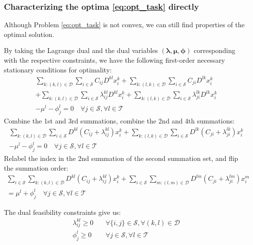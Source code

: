 \subsubsection{Characterizing the optima \eqref{eq:opt_task} directly}
Although Problem \eqref{eq:opt_task} is not convex, we can still find properties of the optimal solution.

By taking the Lagrange dual and the dual variables $(\boldsymbol{\lambda},\boldsymbol{\mu},\boldsymbol{\phi})$ corresponding with the respective constraints, we have the following first-order necessary stationary conditions for optimality:
\begin{align}
	\sum_{k:(k,l)\in\mathcal{D}}\sum_{i\in\mathcal{S}}C_{ij}D^{kl}x_i^k + \sum_{k:(l,k)\in\mathcal{D}}\sum_{i\in\mathcal{S}}C_{ji}D^{lk}x_i^k \nonumber \\
	+ \sum_{k:(k,l)\in\mathcal{D}}\sum_{i\in\mathcal{S}}\lambda_{ij}^{kl}D^{kl}x_i^k + \sum_{k:(l,k)\in\mathcal{D}}\sum_{i\in\mathcal{S}}\lambda_{ji}^{lk}D^{lk}x_i^k \nonumber \\
	- \mu^l - \phi_j^l = 0
	\quad \forall j\in\mathcal{S},\forall l\in\mathcal{T} \nonumber
\end{align}
Combine the 1st and 3rd summations, combine the 2nd and 4th summations:
\begin{align}
	\sum_{k:(k,l)\in\mathcal{D}}\sum_{i\in\mathcal{S}} D^{kl}(C_{ij} + \lambda_{ij}^{kl})x_i^k
	+ \sum_{k:(l,k)\in\mathcal{D}}\sum_{i\in\mathcal{S}} D^{lk}(C_{ji} + \lambda_{ji}^{lk})x_i^k \nonumber \\
	- \mu^l - \phi_j^l = 0
	\quad \forall j\in\mathcal{S},\forall l\in\mathcal{T} \nonumber
\end{align}
Relabel the index in the 2nd summation of the second summation set, and flip the summation order:
\begin{align}
	\sum_{i\in\mathcal{S}}\sum_{k:(k,l)\in\mathcal{D}} D^{kl}(C_{ij} + \lambda_{ij}^{kl})x_i^k
	+ \sum_{i\in\mathcal{S}}\sum_{m:(l,m)\in\mathcal{D}} D^{lm}(C_{ji} + \lambda_{ji}^{lm})x_i^m \nonumber \\
	= \mu^l + \phi_j^l
	\quad \forall j\in\mathcal{S},\forall l\in\mathcal{T} \label{eq:cond_stat}
\end{align}

The dual feasibility constraints give us:
\begin{subequations}\label{eq:cond_dual}
	\begin{align}
		\lambda_{ij}^{kl} \geq 0 & \quad \forall\{i,j\}\in\mathcal{S}, \forall(k,l)\in\mathcal{D} \label{eq:cond_dual_lambda} \\
		\phi_j^l \geq 0 & \quad \forall j\in\mathcal{S},\forall l\in\mathcal{T} \label{eq:cond_dual_phi}
	\end{align}
\end{subequations}

